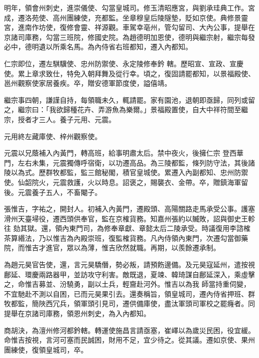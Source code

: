 \begin{pinyinscope}
 明年，領會州刺史，進崇儀使、勾當皇城司。修玉清昭應宮，與劉承珪典工作。宮成，遷洛苑使、高州團練使，充都監。坐章穆皇后陵隧墊，貶如京使。典修景靈宮，進南作坊使，復修會靈、祥源觀。車駕幸亳州，管勾留司、大內公事，提舉在京諸司庫務，勾當三班院，修國史院。為趙德明加恩使，德明與繼宗射，繼宗每發必中，德明遺以所乘名馬。為內侍省右班都知，遷入內都知。



 仁宗即位，遷左騏驥使、忠州防禦使、永定陵修奉鈐
 轄。歷昭宣、宣政、宣慶使。累上章求致仕，特免入朝拜舞及從行幸。頃之，復固請罷都知，以景福殿使、邕州觀察使家居養疾。卒，贈安德軍節度使，謚僖靖。



 繼宗事四朝，謙謹自持，每領職未久，輒請罷。家有園池，退朝即亟歸，同列或留之，繼宗曰：「我欲歸種花卉、弄游魚為樂爾。」景福殿置使，自大中祥符間至繼宗，授者才三人。養子元用、元震。



 元用終左藏庫使、梓州觀察使。



 元震以兄蔭補入內黃門，轉高班，給事明肅太后。禁中夜火，後擁仁宗
 登西華門，左右未集，元震獨傳呼宿衛，以功遷高品。為三陵都監，條列防守法，其後諸陵以為式。歷群牧都監，監三館秘閣，積官皇城使。累遷入內副都知、忠州防禦使。仙韶院火，元震救護，火以時息。詔褒之，賜襲衣、金帶。卒，贈鎮海軍留後。元震養子五人，不畜閹子。



 張惟吉，字祐之，開封人。初補入內黃門，遷殿頭、高陽關路走馬承受公事。護塞滑州天臺埽役，遷西頭供奉官，監在京榷貨務。知嘉州張約以贓敗，詔與御史王軫往
 劾其獄。還，領內東門司，為修奉章獻、章懿太后二陵承受。時議復用李諮榷茶算緡法，乃以惟吉為內殿崇班，復監榷貨務。凡內侍領內東門，次遷勾當御藥院，而惟吉才進官，眾以為薄，惟吉欣然就職。再期，以羨餘遷承制。



 為趙元昊官告使，還，言元昊驕僭，勢必叛，請預飭邊備。及元昊寇延州，遣按視鄜延、環慶兩路器甲，並訪攻守利害。敵既退，夏竦、韓琦謀自鄜延深入，乘虛擊之，命惟吉募並、汾驍勇，副以土兵，輕齎赴河外。惟吉以為我
 師當持重伺變，不宜馳赴不測以自困，已而元昊果引去。還奏稱旨，領皇城司，遷內侍省押班、群牧都監，簡陜西冗兵，領軍頭引見司，遷供備庫使，盡汰軍頭司軍校之罷癃者。同提舉在京諸司庫務，領恩州刺史，為入內都知。



 商胡決，為澶州修河都鈐轄。轉運使施昌言請亟塞，崔嶧以為歲災民困，役宜緩。命惟吉按視，言河可塞而民誠困，財用不足，宜少待之。從其議。遷如京使、果州團練使，復領皇城司，卒。




\end{pinyinscope}
